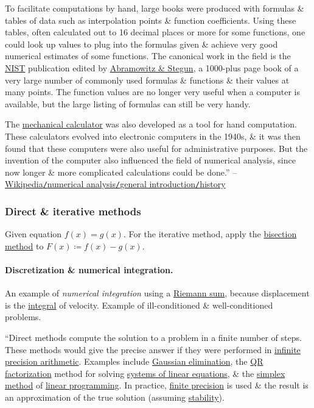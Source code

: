 \documentclass[oneside]{book}
\numberwithin{equation}{section}
\begin{document}
To facilitate computations by hand, large books were produced with formulas \& tables of data such as interpolation points \& function coefficients. Using these tables, often calculated out to 16 decimal places or more for some functions, one could look up values to plug into the formulas given \& achieve very good numerical estimates of some functions. The canonical work in the field is the \href{https://en.wikipedia.org/wiki/NIST}{NIST} publication edited by \href{https://en.wikipedia.org/wiki/Abramowitz_and_Stegun}{Abramowitz \& Stegun}, a 1000-plus page book of a very large number of commonly used formulas \& functions \& their values at many points. The function values are no longer very useful when a computer is available, but the large listing of formulas can still be very handy.

The \href{https://en.wikipedia.org/wiki/Mechanical_calculator}{mechanical calculator} was also developed as a tool for hand computation. These calculators evolved into electronic computers in the 1940s, \& it was then found that these computers were also useful for administrative purposes. But the invention of the computer also influenced the field of numerical analysis, since now longer \& more complicated calculations could be done.'' -- \href{https://en.wikipedia.org/wiki/Numerical_analysis#History}{Wikipedia\texttt{/}numerical analysis\texttt{/}general introduction\texttt{/}history}

\subsubsection{Direct \& iterative methods}
Given equation $f(x) = g(x)$. For the iterative method, apply the \href{https://en.wikipedia.org/wiki/Bisection_method}{bisection method} to $F(x)\coloneqq f(x) - g(x)$.

\paragraph{Discretization \& numerical integration.} An example of \textit{numerical integration} using a \href{https://en.wikipedia.org/wiki/Riemann_sum}{Riemann sum}, because displacement is the \href{https://en.wikipedia.org/wiki/Integral}{integral} of velocity. Example of ill-conditioned \& well-conditioned problems.

``Direct methods compute the solution to a problem in a finite number of steps. These methods would give the precise answer if they were performed in \href{https://en.wikipedia.org/wiki/Arbitrary-precision_arithmetic}{infinite precision arithmetic}. Examples include \href{https://en.wikipedia.org/wiki/Gaussian_elimination}{Gaussian elimination}, the \href{https://en.wikipedia.org/wiki/QR_decomposition}{QR factorization} method for solving \href{https://en.wikipedia.org/wiki/System_of_linear_equations}{systems of linear equations}, \& the \href{https://en.wikipedia.org/wiki/Simplex_method}{simplex method} of \href{https://en.wikipedia.org/wiki/Linear_programming}{linear programming}. In practice, \href{https://en.wikipedia.org/wiki/Floating_point}{finite precision} is used \& the result is an approximation of the true solution (assuming \href{https://en.wikipedia.org/wiki/Numerically_stable}{stability}).
\end{document}
